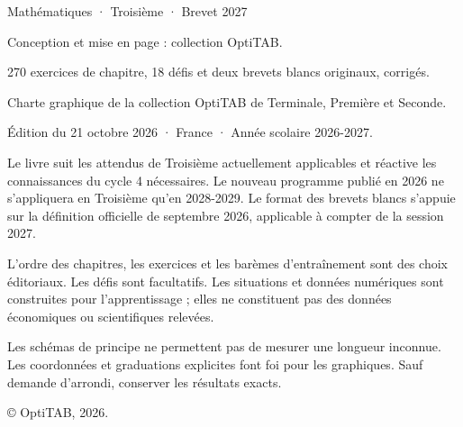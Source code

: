 \thispagestyle{empty}\vspace*{\fill}
\begin{minipage}{128mm}\fontsize{9}{13}\selectfont\color{otMuted}
{\otSemi\color{otInk}Mathématiques · Troisième · Brevet 2027}\par\medskip
Conception et mise en page : collection OptiTAB.\par
270 exercices de chapitre, 18 défis et deux brevets blancs originaux, corrigés.\par
Charte graphique de la collection OptiTAB de Terminale, Première et Seconde.\par\bigskip
Édition du 21 octobre 2026 · France · Année scolaire 2026-2027.\par\bigskip
Le livre suit les attendus de Troisième actuellement applicables et réactive
les connaissances du cycle 4 nécessaires. Le nouveau programme publié en 2026
ne s’appliquera en Troisième qu’en 2028-2029. Le format des brevets blancs
s’appuie sur la définition officielle de septembre 2026, applicable à compter
de la session 2027.\par\bigskip
L’ordre des chapitres, les exercices et les barèmes d’entraînement sont des
choix éditoriaux. Les défis sont facultatifs. Les situations et données
numériques sont construites pour l’apprentissage ; elles ne constituent pas
des données économiques ou scientifiques relevées.\par\bigskip
Les schémas de principe ne permettent pas de mesurer une longueur inconnue.
Les coordonnées et graduations explicites font foi pour les graphiques.
Sauf demande d’arrondi, conserver les résultats exacts.\par\bigskip
© OptiTAB, 2026.\par\otSite
\end{minipage}\clearpage
